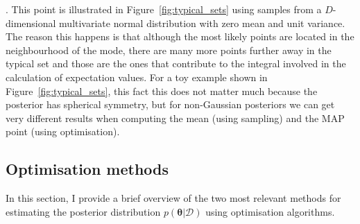 \documentclass[12pt,dvipsnames]{report}
\renewcommand{\vec}[1]{\boldsymbol{\mathbf{#1}}}
\begin{document}
\citep[for a good overview of this issue see][]{arXiv:1701.02434}.
This point is illustrated in Figure~\ref{fig:typical_sets} using samples from 
a $D$-dimensional multivariate normal distribution with zero mean and unit 
variance. 
The reason this happens is that  although the most likely points are located 
in the neighbourhood of the mode, 
there are many more points further away in the typical set and those are the 
ones that contribute to the integral involved in the calculation of expectation 
values.
For a toy example shown in Figure~\ref{fig:typical_sets}, this fact this does not 
matter much because the posterior has spherical symmetry, but for non-Gaussian
posteriors we can get very different results  when computing the mean (using
sampling) and the MAP point (using optimisation).


\subsection{Optimisation methods}
In this section, I provide a brief overview of the two most relevant methods for
estimating the posterior distribution $p(\vec{\theta}\lvert \mathcal{D})$ using
optimisation algorithms.
\end{document}
